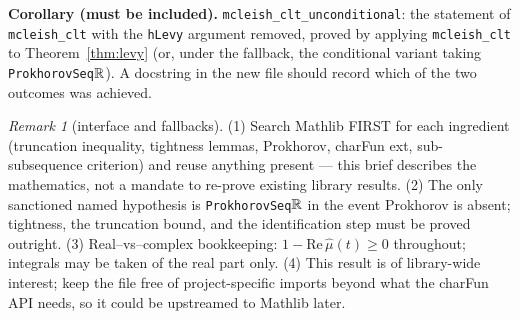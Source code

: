\documentclass[11pt]{article}
\theoremstyle{plain}
\theoremstyle{remark}
\newtheorem{remark}{Remark}
\begin{document}
\medskip\noindent\textbf{Corollary (must be included).}
\texttt{mcleish\_clt\_unconditional}: the statement of \texttt{mcleish\_clt}
with the \texttt{hLevy} argument removed, proved by applying
\texttt{mcleish\_clt} to Theorem~\ref{thm:levy} (or, under the fallback, the
conditional variant taking \texttt{ProkhorovSeq}$\mathbb{R}$). A docstring in the new
file should record which of the two outcomes was achieved.

\begin{remark}[interface and fallbacks]
(1) Search Mathlib FIRST for each ingredient (truncation inequality, tightness
lemmas, Prokhorov, charFun ext, sub-subsequence criterion) and reuse anything
present --- this brief describes the mathematics, not a mandate to re-prove
existing library results.
(2) The only sanctioned named hypothesis is \texttt{ProkhorovSeq}$\mathbb{R}$ in the
event Prokhorov is absent; tightness, the truncation bound, and the
identification step must be proved outright.
(3) Real--vs--complex bookkeeping: $1-\mathrm{Re}\,\widehat\mu(t)\ge0$
throughout; integrals may be taken of the real part only.
(4) This result is of library-wide interest; keep the file free of
project-specific imports beyond what the charFun API needs, so it could be
upstreamed to Mathlib later.
\end{remark}
\end{document}
